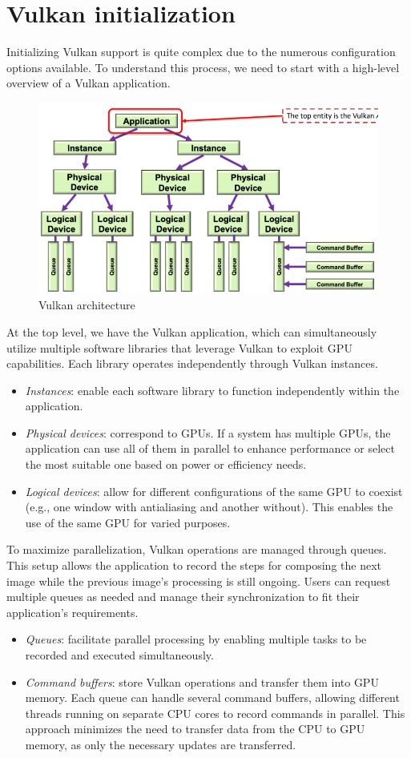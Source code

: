 \section{Vulkan initialization}

Initializing Vulkan support is quite complex due to the numerous configuration options available. 
To understand this process, we need to start with a high-level overview of a Vulkan application.
\begin{figure}[H]
    \centering
    \includegraphics[width=0.4\linewidth]{images/vulkan.png}
    \caption{Vulkan architecture}
\end{figure}
At the top level, we have the Vulkan application, which can simultaneously utilize multiple software libraries that leverage Vulkan to exploit GPU capabilities. 
Each library operates independently through Vulkan instances.
\begin{itemize}
    \item \textit{Instances}: enable each software library to function independently within the application.
    \item \textit{Physical devices}: correspond to GPUs. 
        If a system has multiple GPUs, the application can use all of them in parallel to enhance performance or select the most suitable one based on power or efficiency needs.
    \item \textit{Logical devices}: allow for different configurations of the same GPU to coexist (e.g., one window with antialiasing and another without). 
        This enables the use of the same GPU for varied purposes.
\end{itemize}
To maximize parallelization, Vulkan operations are managed through queues. 
This setup allows the application to record the steps for composing the next image while the previous image's processing is still ongoing. 
Users can request multiple queues as needed and manage their synchronization to fit their application's requirements.
\begin{itemize}
    \item \textit{Queues}: facilitate parallel processing by enabling multiple tasks to be recorded and executed simultaneously.
    \item \textit{Command buffers}: store Vulkan operations and transfer them into GPU memory. 
        Each queue can handle several command buffers, allowing different threads running on separate CPU cores to record commands in parallel. 
        This approach minimizes the need to transfer data from the CPU to GPU memory, as only the necessary updates are transferred.
\end{itemize}

